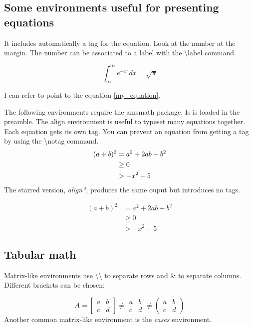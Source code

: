 \documentclass[a4paper]{article}
\newcommand{\bs}[1]{{\color{blue}\textbackslash{}#1}}
\begin{document}
\subsection{Some environments useful for presenting equations}


It includes automatically a tag for the equation. Look at the number at the margin. The number can be associated to a label with the \bs{label} command. 

  \begin{equation}\label{my_equation}
    \int_{\infty}^\infty e^{-x^2} dx = \sqrt{\pi}
  \end{equation}

I can refer to point to the equation \ref{my_equation}.\\


The following environments require the {\ttfamily amsmath} package. Is is loaded in the preamble. The align environment is useful to typeset many equations together. Each equation gets its own tag. You can prevent an equation from getting a tag by using the \bs{notag} command.
%
  \begin{align}
    (a+b)^2 &= a^2 + 2ab + b^2 \\
      & \geq 0 \\
      & > - x^2 +5 \notag
   \end{align}
%   
The starred version, \emph{align*}, produces the same ouput but introduces no tags.

  \begin{align*}
    (a+b)^2 &= a^2 + 2ab + b^2 \\
      & \geq 0 \\
      & > - x^2 +5
  \end{align*}
   
\subsection{Tabular math}

  Matrix-like environments use \bs{\bs{}} to separate rows and \& to separate columns. Different brackets can be chosen:
  

  $$%
    A = %
    \begin{bmatrix}
      a & b \\ c & d
    \end{bmatrix} \neq %
    \begin{matrix}
      a & b \\ c & d
    \end{matrix} \neq %
    \begin{pmatrix}
      a & b \\ c & d
    \end{pmatrix}
  $$
%
Another common matrix-like environment is the \emph{cases} environment.
\end{document}
